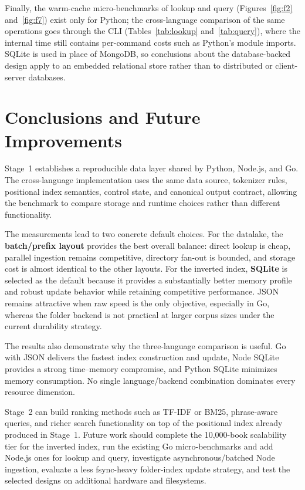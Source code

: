 \documentclass[12pt,a4paper]{article}
\begin{document}
	Finally, the warm-cache micro-benchmarks of lookup and query (Figures~\ref{fig:f2}
	and~\ref{fig:f7}) exist only for Python; the cross-language comparison of the same
	operations goes through the CLI (Tables~\ref{tab:lookup} and~\ref{tab:query}), where
	the internal time still contains per-command costs such as Python's module imports.
	SQLite is used in place of MongoDB, so conclusions about the
	database-backed design apply to an embedded relational store rather than to distributed or
	client-server databases.
	
	\section{Conclusions and Future Improvements}
	Stage~1 establishes a reproducible data layer shared by Python, Node.js, and Go. The
	cross-language implementation uses the same data source, tokenizer rules, positional
	index semantics, control state, and canonical output contract, allowing the benchmark to
	compare storage and runtime choices rather than different functionality.
	
	The measurements lead to two concrete default choices. For the datalake, the
	\textbf{batch/prefix layout} provides the best overall balance: direct lookup is cheap,
	parallel ingestion remains competitive, directory fan-out is bounded, and storage cost is
	almost identical to the other layouts. For the inverted index, \textbf{SQLite} is selected
	as the default because it provides a substantially better memory profile and robust update
	behavior while retaining competitive performance. JSON remains attractive when raw speed
	is the only objective, especially in Go, whereas the folder backend is not practical at
	larger corpus sizes under the current durability strategy.
	
	The results also demonstrate why the three-language comparison is useful. Go with JSON
	delivers the fastest index construction and update, Node SQLite provides a strong
	time--memory compromise, and Python SQLite minimizes memory consumption. No single
	language/backend combination dominates every resource dimension.
	
	Stage~2 can build ranking methods such as TF-IDF or BM25, phrase-aware queries, and richer
	search functionality on top of the positional index already produced in Stage~1. Future
	work should complete the 10,000-book scalability tier for the inverted index, run the
	existing Go micro-benchmarks and add Node.js ones for lookup and query, investigate asynchronous/batched Node ingestion, evaluate a less
	fsync-heavy folder-index update strategy, and test the selected designs on additional
	hardware and filesystems.
	
\end{document}
